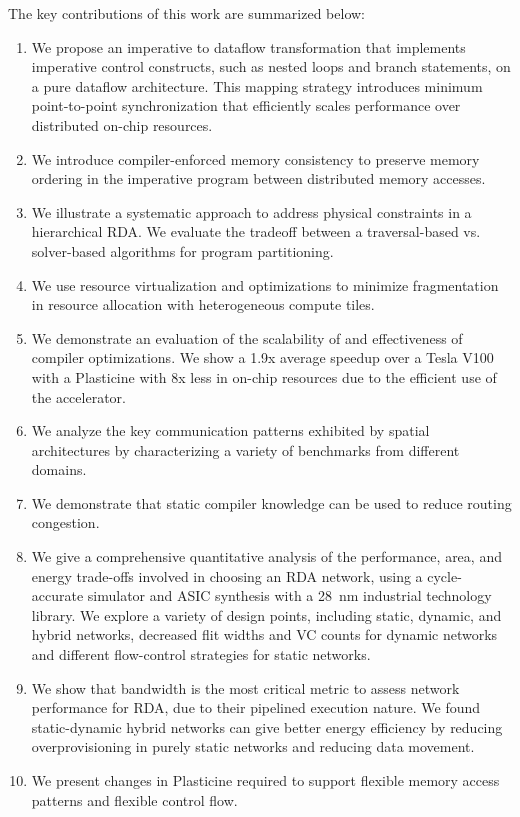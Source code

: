 The key contributions of this work are summarized below:
\begin{enumerate}
    \item We propose an imperative to dataflow transformation that implements imperative control constructs, such as nested loops and branch statements, on a pure dataflow architecture.
      This mapping strategy introduces minimum point-to-point synchronization that efficiently scales performance over distributed on-chip resources.
    \item We introduce compiler-enforced memory consistency to preserve memory ordering in the imperative program between distributed memory accesses.
    \item We illustrate a systematic approach to address physical constraints in a hierarchical RDA.
      We evaluate the tradeoff between a traversal-based vs. solver-based algorithms for program partitioning. 
    \item We use resource virtualization and optimizations to minimize fragmentation in resource allocation with heterogeneous compute tiles.
    \item We demonstrate an evaluation of the scalability of \name and effectiveness of compiler optimizations.
      We show a 1.9x average speedup over a Tesla V100 with a Plasticine with 8x less in on-chip
      resources due to the efficient use of the accelerator.
    \item We analyze the key communication patterns exhibited by spatial architectures by characterizing a variety of benchmarks from different domains.
    \item We demonstrate that static compiler knowledge can be used to reduce routing congestion.
    \item We give a comprehensive quantitative analysis of the performance, area, and energy trade-offs 
      involved in choosing an RDA network, using a cycle-accurate simulator and ASIC synthesis with a \SI{28}{nm} industrial technology library.
      We explore a variety of design points, including static, dynamic, and hybrid networks, decreased flit widths and VC counts for dynamic networks and different flow-control strategies for static networks.
    \item We show that bandwidth is the most critical metric to assess network performance for RDA,
      due to their pipelined execution nature. We found static-dynamic hybrid networks can give
      better energy efficiency by reducing overprovisioning in purely static networks and reducing
      data movement.
    \item We present changes in Plasticine required to support flexible memory access patterns and flexible control flow.
\end{enumerate}

